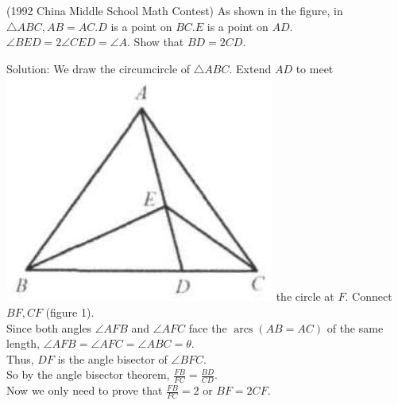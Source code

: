 \documentclass{article}
\begin{document}
(1992 China Middle School Math Contest) As shown in the figure, in \(\triangle A B C, A B=A C . D\) is a point on \(B C . E\) is a point on \(A D\). \(\angle B E D=2 \angle C E D=\angle A\). Show that \(B D=2 C D\).

Solution:
We draw the circumcircle of \(\triangle A B C\). Extend \(A D\) to meet\\
\includegraphics[width=\textwidth]{images/202(2).jpg} the circle at \(F\). Connect \(B F, C F\) (figure 1).\\
Since both angles \(\angle A F B\) and \(\angle A F C\) face the \(\operatorname{arcs}(A B=A C)\) of the same length, \(\angle A F B=\angle A F C=\angle A B C=\theta\).\\
Thus, \(D F\) is the angle bisector of \(\angle B F C\).\\
So by the angle bisector theorem, \(\frac{F B}{F C}=\frac{B D}{C D}\).\\
Now we only need to prove that \(\frac{F B}{F C}=2\) or \(B F=2 C F\).\\
\centering
\end{document}
